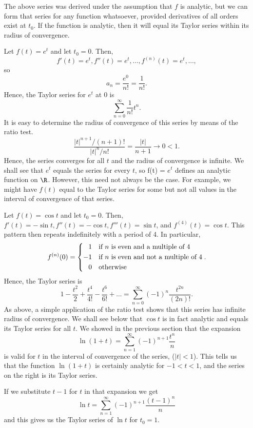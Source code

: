 The above series was derived under the assumption that $f$ is
analytic, but we can form that series
for any function whatsoever, provided
derivatives of all orders exist at $t_0$. If the function is analytic,
then it will equal its Taylor series within its radius of convergence.

\nextex
{}  Let $f(t) = e^t$ and let $t_0 = 0$.
Then,  
$$f'(t) = e^t, f''(t) = e^t, \dots, f^{(n)}(t) = e^t, \dots,$$
so
$$
a_n = \frac {e^0}{n!} = \frac 1{n!}.
$$
Hence, the Taylor series for $e^t$ at $0$ is
$$
\sum_{n=0}^\infty \frac 1{n!} t^n.
$$
It is easy to determine the radius of convergence of this series
by means of the ratio test.
$$
\frac{|t|^{n+1}/(n+1)!}{|t|^n/n!} = \frac{|t|}{n+1} \to 0 < 1.
$$
Hence, the series converges for all $t$ and the radius of convergence
is infinite.  We shall see that $e^t$ equals the series for every
$t$, so f(t) = $e^t$ defines an analytic function  on $\R$.  However,
this need not always be the case.  For example,  we might have
$f(t)$ equal to the Taylor series for some but not all values in the interval
of convergence of that series. 
\endexample

\nextex
{}  Let $f(t) = \cos t$ and let $t_0 = 0$.
Then, $f'(t) = -\sin t, f''(t) = -\cos t, f'''(t) = \sin t$,
and $f^{(4)}(t) = \cos t$.  This pattern then repeats indefinitely
with a period of 4.  In particular,
$$
f^{(n)}(0) = \left\{\aligned 1\quad&\text{if $n$ is even and a multiple of 4}\\
-1\quad&\text{if $n$ is even and not a multiple of 4}\\
 0\quad&\text{otherwise}
\endaligned \right..
$$
Hence, the Taylor series is
$$
1 - \frac{t^2}{2} + \frac{t^4}{4!} - \frac{t^6}{6!} + \dots
= \sum_{n=0}^\infty (-1)^n\frac{t^{2n}}{(2n)!}.
$$
As above, a simple application of the ratio test shows that this
series has infinite radius of convergence.  We shall see below
that $\cos t$ is in fact analytic and equals its Taylor series for
all $t$.
\endexample
\nextex
{}  We showed in the previous section that the
expansion
$$
\ln (1 + t) = \sum_{n=1}^\infty (-1)^{n+1} \frac{t^n}n
$$
is valid for $t$ in the interval of convergence of the series,
($|t| < 1$).    This tells us that the function $\ln (1 + t)$
is certainly analytic for $-1 < t < 1$, and the series on the
right is its Taylor series.

If we substitute $t - 1$ for $t$ in that expansion we get
$$
\ln t = \sum_{n=1}^\infty (-1)^{n+1} \frac{(t -1)^n}n
$$
and this gives us the Taylor series of $\ln t$ for $t_0 = 1$.
\endexample

